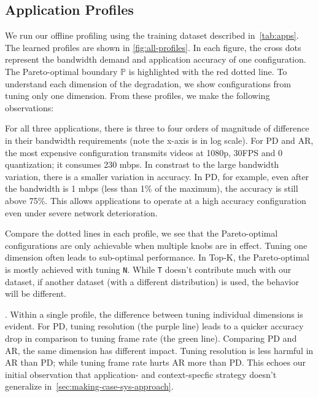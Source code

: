 \subsection{Application Profiles}
\label{sec:application-profiles}

We run our offline profiling using the training dataset described
in~\autoref{tab:apps}. The learned profiles are shown in
\autoref{fig:all-profiles}. In each figure, the cross dots represent the
bandwidth demand and application accuracy of one configuration. The
Pareto-optimal boundary $\mathbb{P}$ is highlighted with the red dotted line. To
understand each dimension of the degradation, we show configurations from tuning
only one dimension. From these profiles, we make the following observations:

 For all three applications, there is three to
four orders of magnitude of difference in their bandwidth requirements (note the
x-axis is in log scale). For PD and AR, the most expensive configuration
transmits videos at 1080p, 30FPS and 0 quantization; it consumes 230 mbps. In
constrast to the large bandwidth variation, there is a smaller variation in
accuracy. In PD, for example, even after the bandwidth is 1 mbps (less than 1\%
of the maximum), the accuracy is still above 75\%. This allows \sysname{}
applications to operate at a high accuracy configuration even under severe
network deterioration.

 Compare the dotted lines in each
profile, we see that the Pareto-optimal configurations are only achievable when
multiple knobs are in effect. Tuning one dimension often leads to sub-optimal
performance. In Top-K, the Pareto-optimal is mostly achieved with tuning
\texttt{N}. While \texttt{T} doesn't contribute much with our dataset, if
another dataset (with a different distribution) is used, the behavior will be
different.

. Within a single profile, the
difference between tuning individual dimensions is evident. For PD, tuning
resolution (the purple line) leads to a quicker accuracy drop in comparison to
tuning frame rate (the green line). Comparing PD and AR, the same dimension has
different impact. Tuning resolution is less harmful in AR than PD; while tuning
frame rate hurts AR more than PD. This echoes our initial observation that
application- and context-specfic strategy doesn't generalize
in~\autoref{sec:making-case-sys-approach}.

